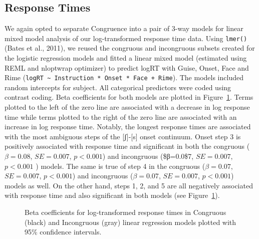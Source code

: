 \documentclass[
  letterpaper,
  DIV=11,
  numbers=noendperiod]{scrartcl}
\begin{document}
\subsection{Response Times}\label{sec-results-rt}

We again opted to separate Congruence into a pair of 3-way models for
linear mixed model analysis of our log-transformed response time data.
Using \texttt{lmer()} (Bates et al., 2011), we reused the congruous and
incongruous subsets created for the logistic regression models and
fitted a linear mixed model (estimated using REML and nloptwrap
optimizer) to predict logRT with Guise, Onset, Face and Rime
(\texttt{logRT\ \textasciitilde{}\ Instruction\ *\ Onset\ *\ Face\ +\ Rime}).
The models included random intercepts for subject. All categorical
predictors were coded using contrast coding. Beta coefficients for both
models are plotted in Figure~\ref{fig-coefs-logRT}. Terms plotted to the
left of the zero line are associated with a decrease in log response
time while terms plotted to the right of the zero line are associated
with an increase in log response time. Notably, the longest response
times are associated with the most ambiguous steps of the
{[}ʃ{]}-{[}s{]} onset continuum. Onset step 3 is positively associated
with response time and significant in both the congruous (\(β=0.08\),
\(SE=0.007\), \(p < 0.001\)) and incongruous (\$β=0.0\$7, \(SE=0.007\),
\(p < 0.001\) ) models. The same is true of step 4 in the congruous
(\(β=0.07\), \(SE=0.007\), \(p < 0.001\)) and incongruous (\(β=0.07\),
\(SE=0.007\), \(p < 0.001\)) models as well. On the other hand, steps 1,
2, and 5 are all negatively associated with response time and also
significant in both models (see Figure~\ref{fig-coefs-logRT}).

\begin{figure}


\caption{\label{fig-coefs-logRT}Beta coefficients for log-transformed
response times in Congruous (black) and Incongruous (gray) linear
regression models plotted with 95\% confidence intervals.}

\end{figure}%
\end{document}
